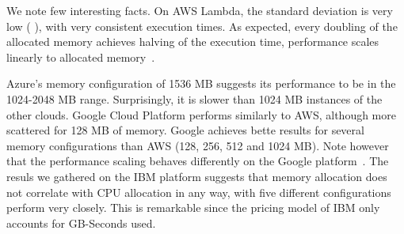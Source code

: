 We note few interesting facts.
On \gls{AWS} Lambda, the standard deviation is very low ( ), with very consistent execution times. 
As expected, every doubling of the allocated memory achieves halving of the execution time, performance scales linearly to allocated memory~\cite{AWSLambdaConfig}. 

Azure's memory configuration of 1536 \gls{MB} suggests its performance to be in the 1024-2048 \gls{MB} range.
Surprisingly, it is slower than 1024 \gls{MB} instances of the other clouds.  
Google Cloud Platform performs similarly to \gls{AWS}, although more scattered for 128 \gls{MB} of memory. 
Google achieves bette results for several memory configurations than \gls{AWS} (128, 256, 512 and 1024 \gls{MB}). %
Note however that the performance scaling behaves differently on the Google platform~\cite{GoogleFunctionsPricing}.
The resuls we gathered on the \gls{IBM} platform suggests that memory allocation does not correlate with \gls{CPU} allocation in any way, with five different configurations perform very closely. 
This is remarkable since the pricing model of \gls{IBM} only accounts for GB-Seconds used. 
 

